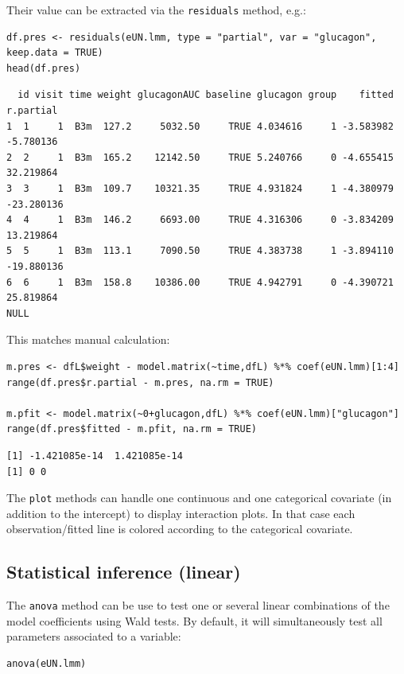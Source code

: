 \documentclass[12pt]{article}
\begin{document}
Their value can be extracted via the \texttt{residuals} method, e.g.:
\lstset{language=r,label= ,caption= ,captionpos=b,numbers=none}
\begin{lstlisting}
df.pres <- residuals(eUN.lmm, type = "partial", var = "glucagon", keep.data = TRUE)
head(df.pres)
\end{lstlisting}

\begin{verbatim}
  id visit time weight glucagonAUC baseline glucagon group    fitted  r.partial
1  1     1  B3m  127.2     5032.50     TRUE 4.034616     1 -3.583982  -5.780136
2  2     1  B3m  165.2    12142.50     TRUE 5.240766     0 -4.655415  32.219864
3  3     1  B3m  109.7    10321.35     TRUE 4.931824     1 -4.380979 -23.280136
4  4     1  B3m  146.2     6693.00     TRUE 4.316306     0 -3.834209  13.219864
5  5     1  B3m  113.1     7090.50     TRUE 4.383738     1 -3.894110 -19.880136
6  6     1  B3m  158.8    10386.00     TRUE 4.942791     0 -4.390721  25.819864
NULL
\end{verbatim}


This matches manual calculation:
\lstset{language=r,label= ,caption= ,captionpos=b,numbers=none}
\begin{lstlisting}
m.pres <- dfL$weight - model.matrix(~time,dfL) %*% coef(eUN.lmm)[1:4]
range(df.pres$r.partial - m.pres, na.rm = TRUE)

m.pfit <- model.matrix(~0+glucagon,dfL) %*% coef(eUN.lmm)["glucagon"]
range(df.pres$fitted - m.pfit, na.rm = TRUE)
\end{lstlisting}

\begin{verbatim}
[1] -1.421085e-14  1.421085e-14
[1] 0 0
\end{verbatim}


The \texttt{plot} methods can handle one continuous and one categorical
covariate (in addition to the intercept) to display interaction
plots. In that case each observation/fitted line is colored according
to the categorical covariate.

\clearpage

\subsection{Statistical inference (linear)}
\label{sec:org636ff5d}

The \texttt{anova} method can be use to test one or several linear
combinations of the model coefficients using Wald tests. By default,
it will simultaneously test all parameters associated to a variable:
\lstset{language=r,label= ,caption= ,captionpos=b,numbers=none}
\begin{lstlisting}
anova(eUN.lmm)
\end{lstlisting}
\end{document}
